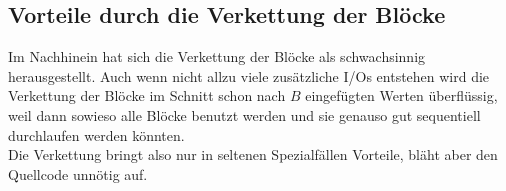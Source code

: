 \documentclass{article}
\begin{document}
\subsection{Vorteile durch die Verkettung der Blöcke}
Im Nachhinein hat sich die Verkettung der Blöcke als schwachsinnig
herausgestellt. Auch wenn nicht allzu viele zusätzliche I/Os entstehen wird die
Verkettung der Blöcke im Schnitt schon nach $B$ eingefügten Werten überflüssig,
weil dann sowieso alle Blöcke benutzt werden und sie genauso gut sequentiell
durchlaufen werden könnten.\\
Die Verkettung bringt also nur in seltenen Spezialfällen Vorteile, bläht aber
den Quellcode unnötig auf.
\end{document}
